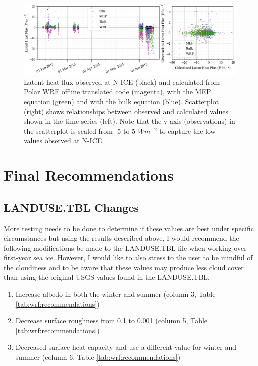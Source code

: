 {\begin{figure}[h]
    \centering
    \includegraphics[width=1\linewidth]{figures/chapter6/latent_wrf.png}
    \caption[Latent heat flux observed at N-ICE and calculated from Polar WRF offline translated code.]{Latent heat flux observed at N-ICE (black) and calculated from Polar WRF offline translated code (magenta), with the MEP equation (green) and with the bulk equation (blue).  Scatterplot (right) shows relationships between observed and calculated values shown in the time series (left). Note that the y-axis (observations) in the scatterplot is scaled from -5 to 5 $Wm^{-2}$ to capture the low values observed at N-ICE.}
    \label{fig:flux:latent}
\end{figure}


\section{Final Recommendations}

\subsection{LANDUSE.TBL Changes}

More testing needs to be done to determine if these values are best under specific circumstances but using the results described above, I would recommend the following modifications be made to the LANDUSE.TBL file when working over first-year sea ice. However, I would like to also stress to the user to be mindful of the cloudiness and to be aware that these values may produce less cloud cover than using the original USGS values found in the LANDUSE.TBL.

\begin{enumerate}
  \item Increase albedo in both the winter and summer (column 3, Table \ref{tab:wrf:recommendations})
   \item Decrease surface roughness from 0.1 to 0.001 (column 5, Table \ref{tab:wrf:recommendations})
  \item Decreased surface heat capacity and use a different value for winter and summer (column 6, Table \ref{tab:wrf:recommendations})
\end{enumerate}

}
